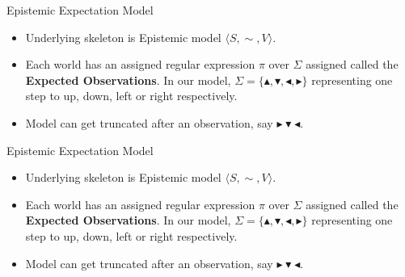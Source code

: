 \documentclass{beamer}
\newcommand\ldiaarg[1]{\langle#1\rangle}
\newcommand{\union}{\cup}
\newcommand{\ep}{\ensuremath{\varepsilon}}
\newcommand{\obsright}{\blacktriangleright}
\newcommand{\obsleft}{\blacktriangleleft}
\newcommand{\obsup}{\blacktriangle}
\newcommand{\obsdown}{\blacktriangledown}
\newcommand{\expwater}{(\obsright \union \obsup)^* (\obsdown \union \obsleft \union \ep) (\obsright \union \obsup)^*}
\newcommand{\exppower}{(\obsleft \union \obsdown)^* (\obsup \union \obsright \union \ep) (\obsleft \union \obsdown)^*}
\newcommand{\exppatrol}{(\obsright^+ \obsdown^+ \obsleft^+ \obsup^+)^*}
\begin{document}
\begin{frame}{Epistemic Expectation Model}
    \begin{itemize}
        \item Underlying skeleton is Epistemic model $\ldiaarg{S,\sim, V}$.
        \item Each world has an assigned regular expression $\pi$ over  $\Sigma$ assigned called the \textbf{Expected Observations}. In our model, $\Sigma = \{\obsup, \obsdown, \obsleft, \obsright\}$ representing one step to up, down, left or right respectively.
        \item Model can get truncated after an observation, say $\obsright\obsdown\obsleft$.
    \end{itemize}
    \begin{figure}
    \end{figure}
\end{frame}
 
 \begin{frame}{Epistemic Expectation Model}
    \begin{itemize}
        \item Underlying skeleton is Epistemic model $\ldiaarg{S,\sim, V}$.
        \item Each world has an assigned regular expression $\pi$ over  $\Sigma$ assigned called the \textbf{Expected Observations}. In our model, $\Sigma = \{\obsup, \obsdown, \obsleft, \obsright\}$ representing one step to up, down, left or right respectively.
        \item Model can get truncated after an observation, say $\obsright\obsdown\obsleft$.
    \end{itemize}
    \begin{figure}
    \end{figure}
\end{frame}
 
\end{document}
